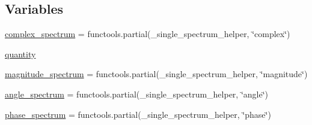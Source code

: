 \subsection*{Variables}
\begin{DoxyCompactItemize}
\item 
\hyperlink{namespacematplotlib_1_1mlab_af9fe23cd7c677efdfda27673cf1acd7b}{complex\+\_\+spectrum} = functools.\+partial(\+\_\+single\+\_\+spectrum\+\_\+helper, \char`\"{}complex\char`\"{})
\item 
\hyperlink{namespacematplotlib_1_1mlab_a6b561b24d549354119a44640169596ff}{quantity}
\item 
\hyperlink{namespacematplotlib_1_1mlab_a0900364120ca4896abeb582fafa87750}{magnitude\+\_\+spectrum} = functools.\+partial(\+\_\+single\+\_\+spectrum\+\_\+helper, \char`\"{}magnitude\char`\"{})
\item 
\hyperlink{namespacematplotlib_1_1mlab_a4c68c82f633551591f79ca822c4cba6f}{angle\+\_\+spectrum} = functools.\+partial(\+\_\+single\+\_\+spectrum\+\_\+helper, \char`\"{}angle\char`\"{})
\item 
\hyperlink{namespacematplotlib_1_1mlab_a3ff39313e62c876e7310b03cbf275a45}{phase\+\_\+spectrum} = functools.\+partial(\+\_\+single\+\_\+spectrum\+\_\+helper, \char`\"{}phase\char`\"{})
\end{DoxyCompactItemize}


